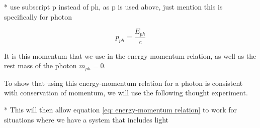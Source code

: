 * use subscript p instead of ph, as p is used above, just mention this is specifically for photon

\begin{equation}
\label{eq: momentum of photon}
p_{ph} = \frac{E_{ph}}{c}
\end{equation}

It is this momentum that we use in the energy momentum relation, as well as the rest mass of the photon $m_{ph}=0$.

To show that using this energy-momentum relation for a photon is consistent with conservation of momentum, we will use the following thought experiment.

* This will then allow equation \eqref{eq: energy-momentum relation} to work for situations where we have a system that includes light













